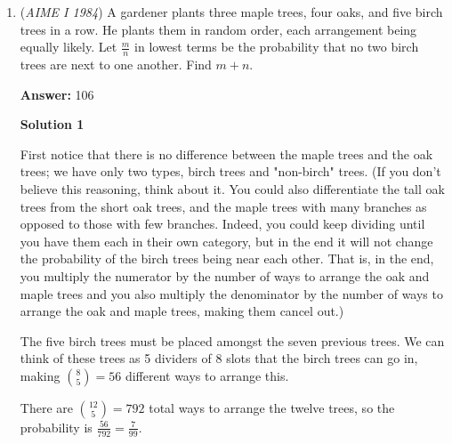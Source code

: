 \begin{enumerate}
 If we thus make $w$ strictly less than 4, and we make $p$ strictly less than 5, then it won't be possible for them to differ enough to permit more than one solution (note that the same can be said if we restrict $w$ to be above 26, or $p$ to be above 25, but these solutions give scores clearly less than 80). It is clear that we won't be able to decrease $w$ by 4 nor decrease $p$ by  5 under these conditions. We also can't increase $w$ by 4, as we would need to increase $c$ by at least 1 ($w$ and $c$ increase in tandem), which necessitates decreasing $p$ by at least 5. We also cannot increase $p$ by 5, as this would require $c$ to decrease by $1$ and $w$ to decrease by 4. 

 The lowest possible score under these conditions is when $c$ is minimized, i.e. $c=23$,  $w=3$,  and  $p=4$, which gives a score of $\boxed{119}$.

 


	\item (\textit{AIME I 1984}) A gardener plants three maple trees, four oaks, and five birch trees in a row. He plants them in random order, each arrangement being equally likely. Let $\frac m n$ in lowest terms be the probability that no two birch trees are next to one another. Find $m+n$.


 
 \textbf{Answer: }106



\textbf{Solution 1}

First notice that there is no difference between the maple trees and the oak trees; we have only two types, birch trees and "non-birch" trees. (If you don't believe this reasoning, think about it. You could also differentiate the tall oak trees from the short oak trees, and the maple trees with many branches as opposed to those with few branches. Indeed, you could keep dividing until you have them each in their own category, but in the end it will not change the probability of the birch trees being near each other. That is, in the end, you multiply the numerator by the number of ways to arrange the oak and maple trees and you also multiply the denominator by the number of ways to arrange the oak and maple trees, making them cancel out.)

 The five birch trees must be placed amongst the seven previous trees. We can think of these trees as 5 dividers of 8 slots that the birch trees can go in, making ${8\choose5} = 56$ different ways to arrange this.

 There are ${12 \choose 5} = 792$ total ways to arrange the twelve trees, so the probability is $\frac{56}{792} = \frac{7}{99}$.


\end{enumerate}
